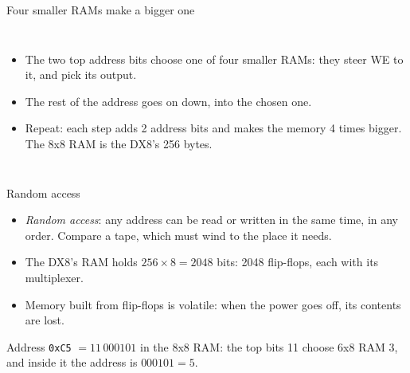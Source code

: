 \documentclass[10pt]{wosm-slides}
\begin{document}
\begin{frame}{Four smaller RAMs make a bigger one}
  \begin{columns}[c, totalwidth=\textwidth]
      \centering
      \begin{itemize}
        \item The two top address bits choose one of four smaller RAMs: they steer WE
          to it, and pick its output.
        \item The rest of the address goes on down, into the chosen one.
        \item Repeat: each step adds 2 address bits and makes the memory 4 times
          bigger. The 8x8 RAM is the DX8's 256 bytes.
      \end{itemize}
  \end{columns}
\end{frame}

\begin{frame}{Random access}
  \begin{itemize}
    \item \emph{Random access}: any address can be read or written in the same time,
      in any order. Compare a tape, which must wind to the place it needs.
    \item The DX8's RAM holds $256 \times 8 = 2048$ bits: 2048 flip-flops, each with
      its multiplexer.
    \item Memory built from flip-flops is \alert{volatile}: when the power goes off,
      its contents are lost.
  \end{itemize}

  \begin{example}
    Address \texttt{0xC5} $= 11\,000101$ in the 8x8 RAM: the top bits 11 choose 6x8
    RAM 3, and inside it the address is $000101 = 5$.
  \end{example}
\end{frame}
\end{document}

